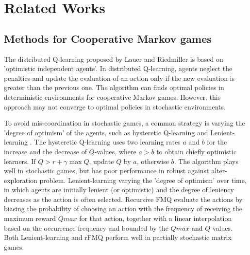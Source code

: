 \documentclass[journal,transmag]{IEEEtran}
\begin{document}

\section{Related Works}
\label{relatedworks}
\subsection{Methods for Cooperative Markov games}
The distributed Q-learning \cite{Lauer2000ICML} proposed by Lauer and Riedmiller is based on 'optimistic independent agents'. In distributed Q-learning, agents neglect the penalties and update the evaluation of an action only if the new evaluation is greater than the previous one. The algorithm can finds optimal policies in deterministic environments for cooperative Markov games. However, this approach may not converge to optimal policies in stochastic environments.

To avoid mis-coordination in stochastic games, a common strategy is varying the 'degree of optimism' of the agents, such as hysteretic Q-learning \cite{matignon2007} and Lenient-learning \cite{Panait2006Lenient,Bloembergen2011ETS}. The hysteretic Q-learning \cite{matignon2007} uses two learning rates $a$ and $b$ for the increase and the decrease of $Q$-values, where $a>b$ to obtain chiefly optimistic learners. If $Q > r + \gamma \max Q$, update $Q$ by $a$, otherwise $b$. The algorithm plays well in stochastic games, but has poor performance in robust against alter-exploration problem. Lenient-learning \cite{Panait2006Lenient} varying the 'degree of optimism' over time, in which agents are initially lenient (or optimistic) and the degree of leniency decreases as the action is often selected. Recursive FMQ\cite{Matignon2012} evaluate the actions by biasing the probability of choosing an action with the frequency of receiving the maximum reward $Qmax$ for that action, together with a linear interpolation based on the occurrence frequency and bounded by the $Qmax$ and $Q$ values. Both Lenient-learning and rFMQ perform well in partially stochastic matrix games.

\end{document}
